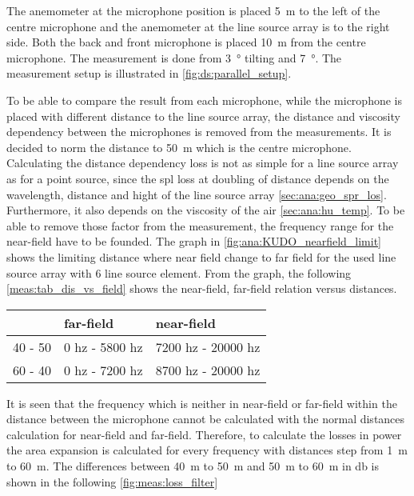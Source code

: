 

The anemometer at the microphone position is placed \SI{5}{\meter} to the left of the centre microphone and the anemometer at the line source array is to the right side. Both the back and front microphone is placed \SI{10}{\meter} from the centre microphone. The measurement is done from  \SI{3}{\degree} tilting and \SI{7}{\degree}. The measurement setup is illustrated in \autoref{fig:ds:parallel_setup}.



To be able to compare the result from each microphone, while the microphone is placed with different distance to the line source array, the distance and viscosity dependency between the microphones is removed from the measurements. It is decided to norm the distance to \SI{50}{\meter} which is the centre microphone. Calculating the distance dependency loss is not as simple for a line source array as for a point source, since the \gls{spl} loss at doubling of distance depends on the wavelength, distance and hight of the line source array \autoref{sec:ana:geo_spr_los}. Furthermore, it also depends on the viscosity of the air \autoref{sec:ana:hu_temp}. To be able to remove those factor from the measurement, the frequency range for the near-field have to be founded. The graph in \autoref{fig:ana:KUDO_nearfield_limit} shows the limiting distance where near field change to far field for the used line source array with 6 line source element. From the graph, the following \autoref{meas:tab_dis_vs_field} shows the near-field, far-field relation versus distances. 

\begin{table}[H]
\begin{tabular}{l|ll}
        & far-field      & near-field         \\ \hline
40 - 50 & 0 hz - 5800 hz & 7200 hz - 20000 hz \\
60 - 40 & 0 hz - 7200 hz & 8700 hz - 20000 hz
\end{tabular}
\label{meas:tab_dis_vs_field}
\end{table}

It is seen that the frequency which is neither in near-field or far-field within the distance between the microphone cannot be calculated with the normal distances calculation for near-field and far-field. Therefore, to calculate the losses in power the area expansion is calculated for every frequency with distances step from \SI{1}{\meter} to \SI{60}{\meter}. The differences between \SI{40}{\meter} to \SI{50}{\meter} and \SI{50}{\meter} to \SI{60}{\meter} in \si{db} is shown in the following \autoref{fig:meas:loss_filter}


